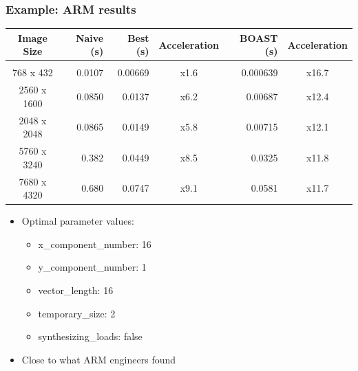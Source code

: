 \documentclass{beamer}
\begin{document}
\begin{frame}
  \frametitle{Example: ARM results}
  \begin{center}
  \scriptsize
  \begin{tabular}{c|r|r|c|r|c}
    Image Size  & Naive (s) & Best (s) & Acceleration & BOAST (s) & Acceleration \\
    \hline&&&&\\
  768 x 432   & 0.0107    & 0.00669  & x1.6         & 0.000639  & x16.7 \\
  2560 x 1600 & 0.0850    & 0.0137   & x6.2         & 0.00687   & x12.4 \\
  2048 x 2048 & 0.0865    & 0.0149   & x5.8         & 0.00715   & x12.1 \\
  5760 x 3240 & 0.382     & 0.0449   & x8.5         & 0.0325    & x11.8 \\
  7680 x 4320 & 0.680     & 0.0747   & x9.1         & 0.0581    & x11.7
  \end{tabular}
  \end{center}

  \begin{itemize}
    \item Optimal parameter values:
    \begin{itemize}
      \item x\_component\_number: 16
      \item y\_component\_number: 1
      \item vector\_length: 16
      \item temporary\_size: 2
      \item synthesizing\_loads: false
    \end{itemize}
    \item Close to what ARM engineers found
  \end{itemize}
\end{frame}
\end{document}
